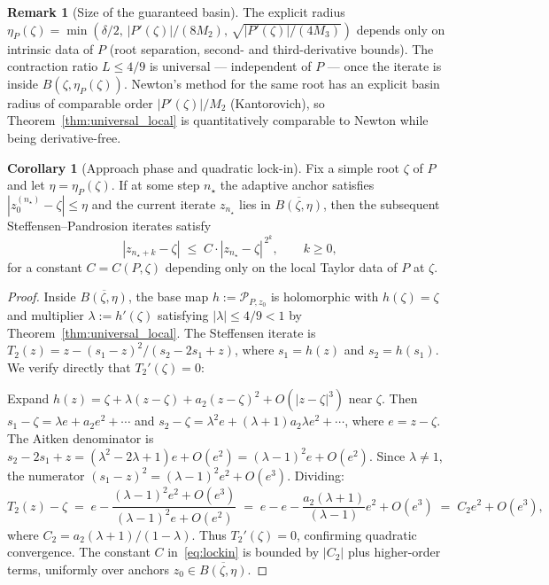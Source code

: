 \documentclass[11pt,a4paper]{article}
\theoremstyle{definition}
\newtheorem{corollary}{Corollary}[section]
\newtheorem{remark}{Remark}[section]
\begin{document}
\begin{remark}[Size of the guaranteed basin]
The explicit radius $\eta_P(\zeta) = \min(\delta/2,\, |P'(\zeta)|/(8M_2),\, \sqrt{|P'(\zeta)|/(4M_3)})$ depends only on intrinsic data of $P$ (root separation, second- and third-derivative bounds).  The contraction ratio $L \leq 4/9$ is universal --- independent of $P$ --- once the iterate is inside $B(\zeta, \eta_P(\zeta))$.  Newton's method for the same root has an explicit basin radius of comparable order $|P'(\zeta)|/M_2$ (Kantorovich), so Theorem~\ref{thm:universal_local} is quantitatively comparable to Newton while being derivative-free.
\end{remark}

\begin{corollary}[Approach phase and quadratic lock-in]
\label{cor:lockin}
Fix a simple root $\zeta$ of $P$ and let $\eta = \eta_P(\zeta)$.  If at some step $n_\star$ the adaptive anchor satisfies $|z_0^{(n_\star)} - \zeta| \leq \eta$ and the current iterate $z_{n_\star}$ lies in $\overline{B(\zeta, \eta)}$, then the subsequent Steffensen--Pandrosion iterates satisfy
\begin{equation}
  \label{eq:lockin}
  |z_{n_\star + k} - \zeta| \;\leq\; C\cdot|z_{n_\star} - \zeta|^{\,2^k}, \qquad k \geq 0,
\end{equation}
for a constant $C = C(P, \zeta)$ depending only on the local Taylor data of $P$ at $\zeta$.
\end{corollary}

\begin{proof}
Inside $\overline{B(\zeta,\eta)}$, the base map $h := \mathcal{P}_{P,z_0}$ is holomorphic with $h(\zeta) = \zeta$ and multiplier $\lambda := h'(\zeta)$ satisfying $|\lambda| \leq 4/9 < 1$ by Theorem~\ref{thm:universal_local}.  The Steffensen iterate is $T_2(z) = z - (s_1 - z)^2/(s_2 - 2s_1 + z)$, where $s_1 = h(z)$ and $s_2 = h(s_1)$.  We verify directly that $T_2'(\zeta) = 0$:

Expand $h(z) = \zeta + \lambda(z - \zeta) + a_2(z-\zeta)^2 + O(|z-\zeta|^3)$ near $\zeta$.  Then $s_1 - \zeta = \lambda e + a_2 e^2 + \cdots$ and $s_2 - \zeta = \lambda^2 e + (\lambda + 1) a_2 \lambda e^2 + \cdots$, where $e = z - \zeta$.  The Aitken denominator is $s_2 - 2s_1 + z = (\lambda^2 - 2\lambda + 1)e + O(e^2) = (\lambda - 1)^2 e + O(e^2)$.  Since $\lambda \neq 1$, the numerator $(s_1 - z)^2 = (\lambda - 1)^2 e^2 + O(e^3)$.  Dividing:
\[
  T_2(z) - \zeta \;=\; e - \frac{(\lambda - 1)^2 e^2 + O(e^3)}{(\lambda-1)^2 e + O(e^2)} \;=\; e - e - \frac{a_2(\lambda+1)}{(\lambda - 1)} e^2 + O(e^3) \;=\; C_2 e^2 + O(e^3),
\]
where $C_2 = a_2(\lambda+1)/(1-\lambda)$.  Thus $T_2'(\zeta) = 0$, confirming quadratic convergence.  The constant $C$ in~\eqref{eq:lockin} is bounded by $|C_2|$ plus higher-order terms, uniformly over anchors $z_0 \in \overline{B(\zeta, \eta)}$.
\end{proof}
\end{document}
